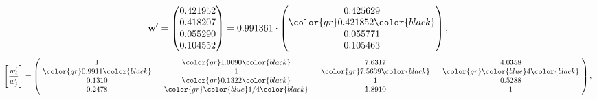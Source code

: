 \begin{example}
\begin{equation*}
\mathbf{w}^{\prime} =
\begin{pmatrix}
0.421952\\
0.418207\\
0.055290\\
0.104552
\end{pmatrix} =
0.991361\cdot
\begin{pmatrix}
0.425629\\
\color{gr} 0.421852\color{black} \\
0.055771\\
0.105463
\end{pmatrix},
\end{equation*}
\begin{equation*}
\left[ \frac{{w}^{\prime}_i}{{w}^{\prime}_j} \right] =
\begin{pmatrix}
$\,\,$ 1 $\,\,$ & $\,\,$\color{gr} 1.0090\color{black} $\,\,$ & $\,\,$7.6317$\,\,$ & $\,\,$4.0358$\,\,$ \\
$\,\,$\color{gr} 0.9911\color{black} $\,\,$ & $\,\,$ 1 $\,\,$ & $\,\,$\color{gr} 7.5639\color{black} $\,\,$ & $\,\,$\color{gr} \color{blue} 4\color{black}   $\,\,$ \\
$\,\,$0.1310$\,\,$ & $\,\,$\color{gr} 0.1322\color{black} $\,\,$ & $\,\,$ 1 $\,\,$ & $\,\,$0.5288 $\,\,$ \\
$\,\,$0.2478$\,\,$ & $\,\,$\color{gr} \color{blue}  1/4\color{black} $\,\,$ & $\,\,$1.8910$\,\,$ & $\,\,$ 1  $\,\,$ \\
\end{pmatrix},
\end{equation*}
\end{example}
\newpage
